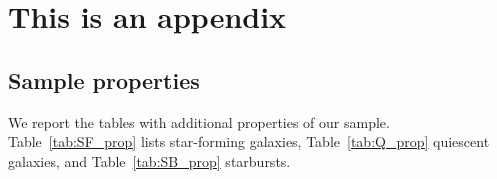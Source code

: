 
\chapter{This is an appendix}


\section{Sample properties} \label{appendix}
We report the tables with additional properties of our sample. Table~\ref{tab:SF_prop} lists star-forming galaxies, Table~\ref{tab:Q_prop}  quiescent galaxies, and Table~\ref{tab:SB_prop} starbursts.

